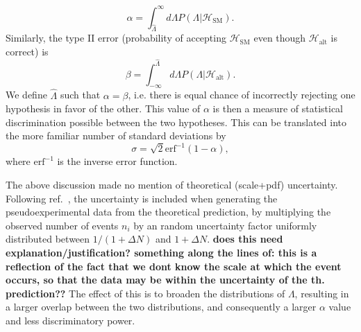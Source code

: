 \documentclass[preprint]{JHEP3} %
\newcommand{\SM}{\mathrm{SM}}
\newcommand{\alt}{\mathrm{alt}}
\def\hLambda {\hat{\Lambda}}
\def\erf{\mathrm{erf}}
\def\HSM{\mathcal{H}_{\mathrm{SM}}}
\def\Halt{\mathcal{H}_{\mathrm{alt}}}
\begin{document}
\begin{equation}
\alpha = \int_{\hLambda}^{\infty} d\Lambda P(\Lambda | {\HSM}).
\end{equation}
Similarly, the type II error (probability of accepting $\mathcal{H}_{\SM}$ even though $\mathcal{H}_{\alt}$ is correct) is 
\begin{equation}
\beta = \int^{\hLambda}_{-\infty} d\Lambda P(\Lambda|\Halt).
\end{equation}
We define $\hLambda$ such that $\alpha=\beta$, i.e. there is equal chance of incorrectly rejecting one hypothesis in favor of the other. This value of $\alpha$ is then a measure of statistical discrimination possible between the two hypotheses. This can be translated into the more familiar number of standard deviations by 
\begin{equation}
\sigma = \sqrt{2}\erf^{-1}(1-\alpha),
\end{equation}
where $\erf^{-1}$ is the inverse error function. 


The above discussion made no mention of theoretical (scale+pdf) uncertainty. Following ref.~\cite{Lykken et al}, the uncertainty is included when generating the pseudoexperimental data from the theoretical prediction, by multiplying the observed number of events $n_i$ by an random uncertainty factor uniformly distributed between $1/(1+\Delta N)$ and $1+\Delta N$. {\bf does this need explanation/justification? something along the lines of: this is a reflection of the fact that we dont know the scale at which the event occurs, so that the data may be within the uncertainty of the th. prediction??} The effect of this is to broaden the distributions of $\Lambda$, resulting in a larger overlap between the two distributions, and consequently a larger $\alpha$ value and less discriminatory power.
\end{document}
